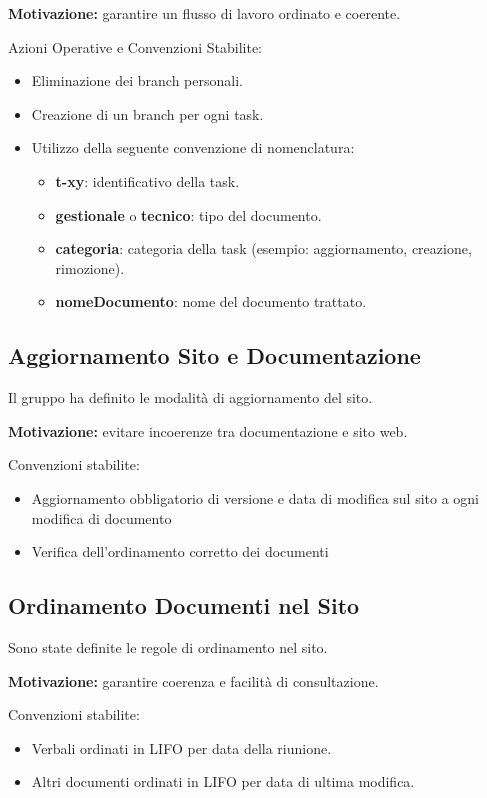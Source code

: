 \textbf{Motivazione:} garantire un flusso di lavoro ordinato e coerente.

Azioni Operative e Convenzioni Stabilite:
\begin{itemize}
	\item Eliminazione dei branch personali.
	\item Creazione di un branch per ogni task.
	\item Utilizzo della seguente convenzione di nomenclatura:
	\begin{itemize}
		\item \textbf{t-xy}: identificativo della task.
		\item \textbf{gestionale} o \textbf{tecnico}: tipo del documento.
		\item \textbf{categoria}: categoria della task (esempio: aggiornamento, creazione, rimozione).
		\item \textbf{nomeDocumento}: nome del documento trattato.
	\end{itemize}
\end{itemize}

\subsection{Aggiornamento Sito e Documentazione}
Il gruppo ha definito le modalità di aggiornamento del sito.

\textbf{Motivazione:} evitare incoerenze tra documentazione e sito web.

Convenzioni stabilite:
\begin{itemize}
	\item Aggiornamento obbligatorio di versione e data di modifica sul sito a ogni modifica di documento
	\item Verifica dell’ordinamento corretto dei documenti
\end{itemize}

\subsection{Ordinamento Documenti nel Sito}
Sono state definite le regole di ordinamento nel sito.

\textbf{Motivazione:} garantire coerenza e facilità di consultazione.

Convenzioni stabilite:
\begin{itemize}
	\item Verbali ordinati in LIFO per data della riunione.
	\item Altri documenti ordinati in LIFO per data di ultima modifica.
\end{itemize}

